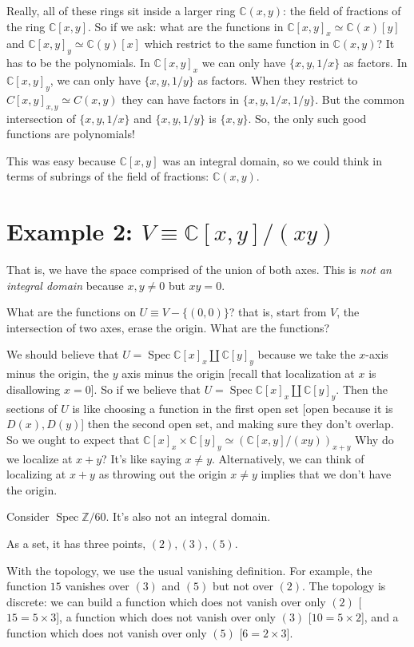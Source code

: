\documentclass{book}
\newcommand{\Z}{\ensuremath{\mathbb{Z}}}
\newcommand{\C}{\ensuremath{\mathbb{C}}}
\newcommand{\Spec}{\operatorname{Spec}}
\newcommand{\spec}{\operatorname{Spec}}
\theoremstyle{definition}
\begin{document}
Really, all of these rings sit inside a larger ring $\C(x, y)$: the field
of fractions of the ring $\C[x, y]$. So if we ask: what are the 
functions in $\C[x, y]_x \simeq \C(x)[y]$ and $\C[x, y]_y \simeq \C(y)[x]$ which
restrict to the same function in $\C(x, y)$? It has to be the polynomials.
In $\C[x, y]_x$ we can only have $\{x, y, 1/x\}$ as factors. In
$\C[x,y]_y$, we can only have $\{x, y, 1/y\}$ as factors. When they
restrict to $C[x, y]_{x, y} \simeq C(x, y)$ they can have factors
in $\{x, y, 1/x, 1/y\}$. But the common intersection of $\{x, y, 1/x\}$
and $\{x, y, 1/y\}$ is $\{x, y\}$. So, the only such good functions
are polynomials!

This was easy because $\C[x, y]$ was an integral domain, so we could think in
terms of subrings of the field of fractions: $\C(x, y)$.

\section{Example 2: $V \equiv \C[x, y]/(xy)$}

That is, we have the space comprised of the union of both axes. This is
\emph{not an integral domain} because $x, y \neq 0$ but $xy = 0$.

What are the functions on $U \equiv V - \{(0, 0)\}$? that is,
start from $V$, the intersection of two axes, erase the origin. What
are the functions?

We should believe that $U = \Spec \C[x]_x \amalg \C[y]_y$ because we 
take the $x$-axis minus the origin, the $y$ axis minus the origin [recall
that localization at $x$ is disallowing $x = 0$]. So if we believe that
$U = \Spec \C[x]_x \amalg \C[y]_y$. Then the sections of $U$ is like
choosing a function in the first open set [open because it is $D(x), D(y)$]
then the second open set, and making sure they don't overlap. So we ought
to expect that $\C[x]_x \times \C[y]_y \simeq (\C[x, y]/(xy))_{x+y}$
Why do we localize at $x + y$? It's like saying $x \neq y$.
Alternatively, we can think of localizing at $x + y$ as throwing out the
origin $x \neq y$ implies that we don't have the origin.


Consider $\spec \Z/60$.  It's also not an integral domain. 

As a set,
it has three points, $(2), (3), (5)$.

With the topology, we use the
usual vanishing definition. For example, the function $15$ vanishes over
$(3)$ and $(5)$ but not over $(2)$. The topology is discrete: we can
build a function which does not vanish over only $(2)$ [$15 = 5 \times 3$], a function
which does not vanish over only $(3)$ [$10 = 5 \times 2$], and a function
which does not vanish over only $(5)$ [$6 = 2 \times 3$].
\end{document}
